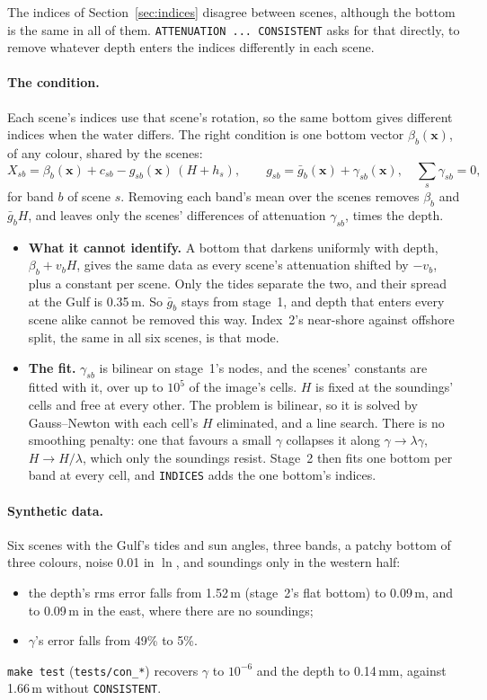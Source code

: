 \documentclass[11pt]{article}
\numberwithin{equation}{section}
\newcommand{\bx}{\mathbf{x}}
\newcommand{\code}[1]{\texttt{#1}}
\begin{document}
The indices of Section~\ref{sec:indices} disagree between scenes, although the bottom is the same in
all of them. \code{ATTENUATION ...\ CONSISTENT} asks for that directly, to remove whatever depth enters
the indices differently in each scene.

\paragraph{The condition.} Each scene's indices use that scene's rotation, so the same bottom gives
different indices when the water differs. The right condition is one bottom vector $\beta_b(\bx)$,
of any colour, shared by the scenes:
\begin{equation}
  X_{sb} = \beta_b(\bx) + c_{sb} - g_{sb}(\bx)\,(H + h_s), \qquad
  g_{sb} = \bar g_b(\bx) + \gamma_{sb}(\bx), \quad \textstyle\sum_s \gamma_{sb} = 0,
  \label{eq:consistent}
\end{equation}
for band $b$ of scene $s$. Removing each band's mean over the scenes removes $\beta_b$ and
$\bar g_b H$, and leaves only the scenes' differences of attenuation $\gamma_{sb}$, times the depth.
\begin{itemize}
\item \textbf{What it cannot identify.} A bottom that darkens uniformly with depth,
  $\beta_b + v_b H$, gives the same data as every scene's attenuation shifted by $-v_b$, plus a
  constant per scene. Only the tides separate the two, and their spread at the Gulf is 0.35\,m.
  So $\bar g_b$ stays from stage~1, and depth that enters every scene alike cannot be removed this
  way. Index~2's near-shore against offshore split, the same in all six scenes, is that mode.
\item \textbf{The fit.} $\gamma_{sb}$ is bilinear on stage~1's nodes, and the scenes' constants are
  fitted with it, over up to $10^5$ of the image's cells. $H$ is fixed at the soundings' cells and
  free at every other. The problem is bilinear, so it is solved by Gauss--Newton with each cell's
  $H$ eliminated, and a line search. There is no smoothing penalty: one that favours a small
  $\gamma$ collapses it along $\gamma \to \lambda\gamma$, $H \to H/\lambda$, which only the
  soundings resist. Stage~2 then fits one bottom per band at every cell, and \code{INDICES} adds
  the one bottom's indices.
\end{itemize}

\paragraph{Synthetic data.} Six scenes with the Gulf's tides and sun angles, three bands, a patchy
bottom of three colours, noise 0.01 in $\ln$, and soundings only in the western half:
\begin{itemize}
\item the depth's rms error falls from 1.52\,m (stage~2's flat bottom) to 0.09\,m, and to 0.09\,m
  in the east, where there are no soundings;
\item $\gamma$'s error falls from 49\% to 5\%.
\end{itemize}
\code{make test} (\code{tests/con\_*}) recovers $\gamma$ to $10^{-6}$ and the depth to 0.14\,mm, against
1.66\,m without \code{CONSISTENT}.
\end{document}
